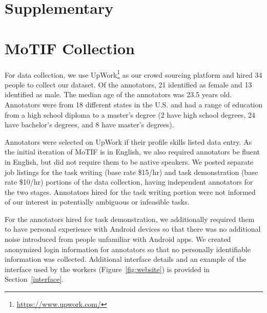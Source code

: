 \section*{\Large Supplementary}

\section{MoTIF Collection}
\label{sec:collection}

For data collection, we use UpWork\footnote{\url{https://www.upwork.com/}} as our crowd sourcing platform and hired 34 people to collect our dataset. Of the annotators, 21 identified as female and 13 identified as male. The median age of the annotators was 23.5 years old. Annotators were from 18 different states in the U.S. and had a range of education from a high school diploma to a master's degree (2 have high school degrees, 24 have bachelor's degrees, and 8 have master's degrees).

Annotators were selected on UpWork if their profile skills listed data entry. As the initial iteration of MoTIF is in English, we also required annotators be fluent in English, but did not require them to be native speakers. We posted separate job listings for the task writing (base rate \$15/hr) and task demonstration (base rate \$10/hr) portions of the data collection, having independent annotators for the two stages. Annotators hired for the task writing portion were not informed of our interest in potentially ambiguous or infeasible tasks.

For the annotators hired for task demonstration, we additionally required them to have personal experience with Android devices so that there was no additional noise introduced from people unfamiliar with Android apps. We created anonymized login information for annotators so that no personally identifiable information was collected. Additional interface details and an example of the interface used by the workers (Figure~\ref{fig:website}) is provided in Section~\ref{interface}. 
